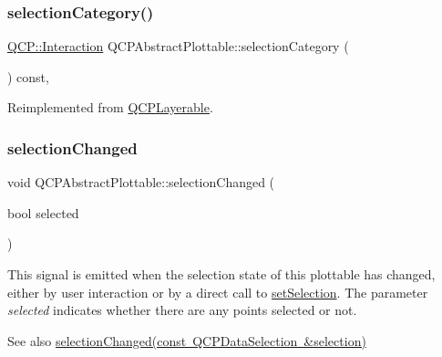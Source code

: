 \subsubsection{\texorpdfstring{selectionCategory()}{selectionCategory()}}
{\footnotesize\ttfamily \mbox{\hyperlink{namespace_q_c_p_a2ad6bb6281c7c2d593d4277b44c2b037}{Q\+C\+P\+::\+Interaction}} Q\+C\+P\+Abstract\+Plottable\+::selection\+Category (\begin{DoxyParamCaption}{ }\end{DoxyParamCaption}) const\hspace{0.3cm}{\ttfamily [protected]}, {\ttfamily [virtual]}}



Reimplemented from \mbox{\hyperlink{class_q_c_p_layerable_a908c9edda761886f33893be326dab77d}{Q\+C\+P\+Layerable}}.

\mbox{\label{class_q_c_p_abstract_plottable_a3af66432b1dca93b28e00e78a8c7c1d9}} 
\subsubsection{\texorpdfstring{selectionChanged}{selectionChanged}\hspace{0.1cm}{\footnotesize\ttfamily [1/2]}}
{\footnotesize\ttfamily void Q\+C\+P\+Abstract\+Plottable\+::selection\+Changed (\begin{DoxyParamCaption}\item[{bool}]{selected }\end{DoxyParamCaption})\hspace{0.3cm}{\ttfamily [signal]}}

This signal is emitted when the selection state of this plottable has changed, either by user interaction or by a direct call to \mbox{\hyperlink{class_q_c_p_abstract_plottable_a219bc5403a9d85d3129165ec3f5ae436}{set\+Selection}}. The parameter {\itshape selected} indicates whether there are any points selected or not.

\begin{DoxySeeAlso}{See also}
\mbox{\hyperlink{class_q_c_p_abstract_plottable_a787a9c39421059006891744b731fa473}{selection\+Changed(const Q\+C\+P\+Data\+Selection \&selection)}} 
\end{DoxySeeAlso}
\mbox{\label{class_q_c_p_abstract_plottable_a787a9c39421059006891744b731fa473}} 
